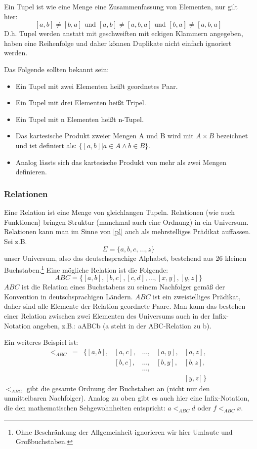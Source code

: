 Ein Tupel ist wie eine Menge eine Zusammenfassung von Elementen, nur gilt hier:
\[[a,b] \neq [b,a] \text{ und } [a,b] \neq [a,b,a] \text{ und } [b,a] \neq [a,b,a]\]
D.h. Tupel werden anstatt mit geschweiften mit eckigen Klammern angegeben,
haben eine Reihenfolge und daher können Duplikate nicht einfach ignoriert werden.

\noindent
Das Folgende sollten bekannt sein:
\begin{itemize}
    \item Ein Tupel mit zwei Elementen heißt geordnetes Paar.
    \item Ein Tupel mit drei Elementen heißt Tripel.
    \item Ein Tupel mit n    Elementen heißt n-Tupel.
    \item Das kartesische Produkt zweier Mengen A und B wird mit $A \times B$ bezeichnet
          und ist definiert als: $\{[a,b]|a \in A \wedge b \in B\}$.
    \item Analog lässts sich das kartesische Produkt von mehr als zwei Mengen definieren.
\end{itemize}

\subsubsection{Relationen}

Eine Relation ist eine Menge von gleichlangen Tupeln.
Relationen (wie auch Funktionen) bringen Struktur (manchmal auch eine Ordnung)
in ein Universum.
Relationen kann man im Sinne von \autoref{pl} auch als mehrstelliges Prädikat auffassen.
Sei z.B.
\[
    \Sigma = \{a,b,c,...,z\}
\]
unser Universum, also das deutschsprachige Alphabet,
bestehend aus 26 kleinen Buchstaben.\footnote{
Ohne Beschränkung der Allgemeinheit ignorieren wir hier Umlaute und Großbuchstaben.}
Eine mögliche Relation ist die Folgende:
\[
    ABC = \{[a,b], [b,c], [c,d], \ldots, [x,y], [y,z]\}
\]
$ABC$ ist die Relation eines Buchstabens zu seinem Nachfolger
gemäß der Konvention in deutschsprachigen Ländern.
$ABC$ ist ein zweistelliges Prädikat, daher sind alle Elemente der Relation geordnete Paare.
Man kann das bestehen einer Relation zwischen zwei Elementen des Universums
auch in der Infix-Notation angeben, z.B.: aABCb (a steht in der ABC-Relation zu b).

Ein weiteres Beispiel ist:
\[
    \begin{array}{lllllll}
        <_{ABC} &
        = &
            \{[a,b], &
            [a,c], &
            \ldots, &
            [a,y], &
            [a,z],\\
        &
        &
        &
            [b,c], &
            \ldots, &
            [b,y], &
            [b,z], \\
        &
        &
        &
        &
            \ldots,\\
        &
        &
        &
        &
        &
        &
            [y,z] \}
\end{array}
\]
$<_{ABC}$ gibt die gesamte Ordnung der Buchstaben an (nicht nur den unmittelbaren Nachfolger).
Analog zu oben gibt es auch hier eine Infix-Notation,
die den mathematischen Sehgewohnheiten entspricht: $a <_{ABC} d$ oder $f <_{ABC} x$.

